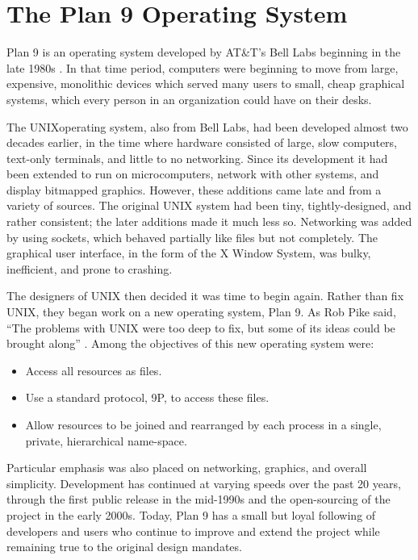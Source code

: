 \documentclass[11pt,american]{report}
\begin{document}
\section{The Plan 9 Operating System}

Plan 9 is an operating system developed by AT\&T's Bell Labs beginning in the late 1980s \cite{Pike95:PBL}. In that time period, computers were beginning to move from large, expensive, monolithic devices which served many users to small, cheap graphical systems, which every person in an organization could have on their desks.

The UNIX\texttrademark operating system, also from Bell Labs, had been developed almost two decades earlier, in the time where hardware consisted of large, slow computers, text-only terminals, and little to no networking. Since its development it had been extended to run on microcomputers, network with other systems, and display bitmapped graphics. However, these additions came late and from a variety of sources. The original UNIX system had been tiny, tightly-designed, and rather consistent; the later additions made it much less so. Networking was added by using sockets, which behaved partially like files but not completely. The graphical user interface, in the form of the X Window System, was bulky, inefficient, and prone to crashing.

The designers of UNIX then decided it was time to begin again. Rather than fix UNIX, they began work on a new operating system, Plan 9. As Rob Pike said, ``The problems with UNIX were too deep to fix, but some of its ideas could be brought along'' \cite{Pike95:PBL}. Among the objectives of this new operating system were:

\begin{itemize}
	\item Access all resources as files.
	\item Use a standard protocol, 9P, to access these files.
	\item Allow resources to be joined and rearranged by each process in a single, private, hierarchical name-space.
\end{itemize}

Particular emphasis was also placed on networking, graphics, and overall simplicity. Development has continued at varying speeds over the past 20 years, through the first public release in the mid-1990s and the open-sourcing of the project in the early 2000s. Today, Plan 9 has a small but loyal following of developers and users who continue to improve and extend the project while remaining true to the original design mandates.
\end{document}
